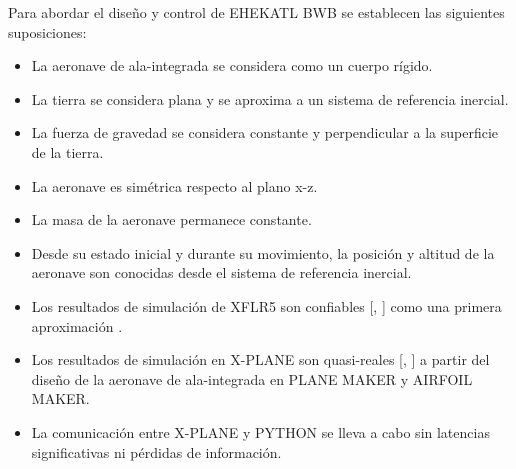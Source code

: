 Para abordar el diseño y control de EHEKATL BWB se establecen las siguientes suposiciones:
\begin{itemize}
    \item La aeronave de ala-integrada se considera como un cuerpo rígido.
    \item La tierra se considera plana y se aproxima a un sistema de referencia inercial.
    \item La fuerza de gravedad se considera constante y perpendicular a la superficie de la tierra. 
    \item La aeronave es simétrica respecto al plano x-z.
    \item La masa de la aeronave permanece constante. 
    \item Desde su estado inicial y durante su movimiento, la posición y altitud de la aeronave son conocidas desde el sistema de referencia inercial.
    \item Los resultados de simulación de XFLR5 son confiables [\cite{Durmus2019}, \cite{Rajesh2020}] como una primera aproximación . 
    \item Los resultados de simulación en X-PLANE son quasi-reales [\cite{Litt2022}, \cite{Thang2016}] a partir del diseño de la aeronave de ala-integrada en PLANE MAKER y AIRFOIL MAKER.
    \item La comunicación entre X-PLANE y PYTHON se lleva a cabo sin latencias significativas ni pérdidas de información.
\end{itemize}



